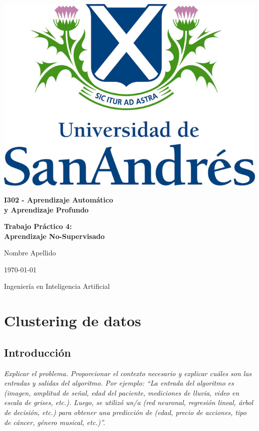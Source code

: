 \documentclass[11pt]{article}
\begin{document}
\begin{titlepage}
    \centering
    \vspace*{2cm}
    \includegraphics[scale=1.8]{Logo-Udesa.jpg}\par
    \vspace{10pt}

    {\LARGE \textbf{I302 - Aprendizaje Automático\\ y Aprendizaje Profundo}\par}
    \vspace{1cm}

    {\LARGE \textbf{Trabajo Práctico 4: \\Aprendizaje No-Supervisado}\par}
    \vspace{4cm}
    
    {\LARGE {Nombre  Apellido}\par}  %
    \vspace{4cm}
    
    {\Large \today\par}
    \vspace{1cm}
    \Large{Ingeniería en Inteligencia Artificial}
\end{titlepage}

\section{Clustering de datos}
\subsection{Introducción}
\textit{Explicar el problema. Proporcionar el contexto necesario y explicar cuáles son las entradas y salidas del algoritmo. Por ejemplo: “La entrada del algoritmo es (imagen, amplitud de señal, edad del paciente, mediciones de lluvia, video en escala de grises, etc.). Luego, se utilizó un/a (red neuronal, regresión lineal, árbol de decisión, etc.) para obtener una predicción de (edad, precio de acciones, tipo de cáncer, género musical, etc.)”.}
\end{document}
